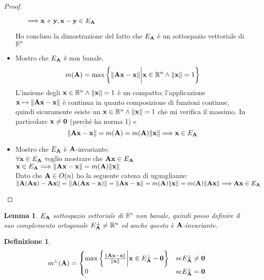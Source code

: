\documentclass[10pt,a4paper]{book}
\newtheorem{definition}{Definizione}[section]
\newtheorem{lemma}[theorem]{Lemma}
\begin{document}
\begin{proof}
\begin{itemize}
\begin{itemize}
$\Longrightarrow \vb{x+y, x-y} \in E_{\vb{A}} $ 
\end{itemize}  
Ho concluso la dimostrazione del fatto che $E_{\vb{A}}$ è un sottospazio vettoriale di $\mathbb{R}^n $
\item Mostro che $E_{\vb{A}}$ è non banale. 
\[ m(\vb{A}) = \max \bigg\{ \norm{\vb{Ax-x}} \bigg|  \vb{x} \in \mathbb{R}^{n} \land \norm{\vb{x}} = 1 \bigg\} \] 
 L'insieme degli $\vb{x} \in \mathbb{R}^{n} \land \norm{\vb{x}} = 1$ è un compatto; l'applicazione $ \vb{x} \mapsto \norm{\vb{Ax-x}}$ è continua in quanto composizione di funzioni continue, quindi sicuramente esiste un $\vb{x} \in \mathbb{R}^{n} \land \norm{\vb{x}} = 1$  che mi verifica il massimo. In particolare $\vb{x} \neq \vb{0}$  (perché ha norma 1) e 
\[ \norm{\vb{Ax - x}} = m(\vb{A}) = m(\vb{A})\norm{\vb{x}} \Longrightarrow \vb{x} \in E_{\vb{A}}\]
\item Mostro che $E_{\vb{A}}$ è $\vb{A}$-invariante. \\
$\forall \vb{x} \in E_{\vb{A}}$  voglio mostrare che $\vb{Ax} \in E_{\vb{A}}$ \\
$\vb{x} \in E_{\vb{A}} \Longrightarrow \norm{\vb{Ax-x}} = m(\vb{A})\norm{\vb{x}} $ \\
Dato che $\vb{A} \in O(n)$ ho la seguente catena di uguaglianze:\\
$ \norm{\vb{A(Ax) - Ax }} =  \norm{\vb{A(Ax-x)}} = \norm{\vb{Ax - x}} = m(\vb{A})\norm{\vb{x}} = m(\vb{A})\norm{\vb{Ax}} \Longrightarrow \vb{Ax} \in E_{\vb{A}}$
\end{itemize} 
\end{proof}
\begin{lemma}
$E_{\vb{A}}$ sottospazio vettoriale di $\mathbb{R}^n $ non banale, quindi posso definire il suo complemento ortogonale $E^{\perp}_{\vb{A}} \neq \mathbb{R}^n$ ed anche questo è $\vb{A}$-invariante. 
\end{lemma} 

\begin{definition}

\[ m^{\perp}(\vb{A}) = \begin{cases} 
      \max \bigg\{ \frac{\norm{\vb{Ax-x}}}{\norm{\vb{x}}} \bigg|  \vb{x} \in E^{\perp}_{\vb{A}} - \vb{0} \bigg\}  &  se   E^{\perp}_{\vb{A}} \neq {\vb{0}} \\
      0 & se   E^{\perp}_{\vb{A}} = {\vb{0}} \\
      
   \end{cases}
\]

\end{definition}
\end{document}
